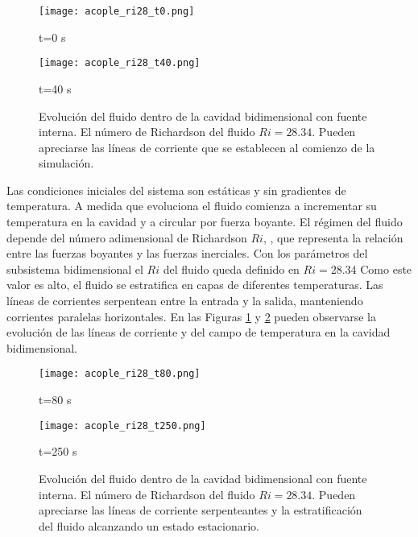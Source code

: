 \begin{figure}['ht]
	\begin{minipage}{0.5\linewidth}
		\centering
		\texttt{[image: acople\_ri28\_t0.png]}
		\caption{t=0 s}
		\label{asd}	
	\end{minipage}
	\begin{minipage}{0.5\linewidth}
		\centering
		\texttt{[image: acople\_ri28\_t40.png]}
		\caption{t=40 s}
		\label{asd}	
	\end{minipage}
	\caption{Evolución del fluido dentro de la cavidad bidimensional con fuente interna.
	El número de Richardson del fluido $Ri=28.34$.
	Pueden apreciarse las líneas de corriente que se establecen al comienzo de la simulación.} 
	\label{acople_ri28_1}
\end{figure}

Las condiciones iniciales del sistema son estáticas y sin gradientes de temperatura.
A medida que evoluciona el fluido comienza a incrementar su temperatura en la cavidad y a circular por fuerza boyante.
El régimen del fluido depende del número adimensional de Richardson $Ri$, \cite{richardson},
que representa la relación entre las fuerzas boyantes y las fuerzas inerciales.
Con los parámetros del subsistema bidimensional el $Ri$ del fluido queda definido en $Ri=28.34$
Como este valor es alto, el fluido se estratifica en capas de diferentes temperaturas.
Las líneas de corrientes serpentean entre la entrada y la salida, manteniendo corrientes paralelas horizontales.
En las Figuras \ref{acople_ri28_1} y \ref{acople_ri28_2} pueden observarse 
la evolución de las líneas de corriente y del campo de temperatura en la cavidad bidimensional.

\begin{figure}['ht]
	\begin{minipage}{0.5\linewidth}
		\centering
		\texttt{[image: acople\_ri28\_t80.png]}
		\caption{t=80 s}
		\label{asd}	
	\end{minipage}
	\begin{minipage}{0.5\linewidth}
		\centering
		\texttt{[image: acople\_ri28\_t250.png]}
		\caption{t=250 s}
		\label{asd}	
	\end{minipage}
	\caption{Evolución del fluido dentro de la cavidad bidimensional con fuente interna.
	El número de Richardson del fluido $Ri=28.34$.
	Pueden apreciarse las líneas de corriente serpenteantes y la estratificación del fluido alcanzando un estado estacionario.}  
	\label{acople_ri28_2}
\end{figure}

